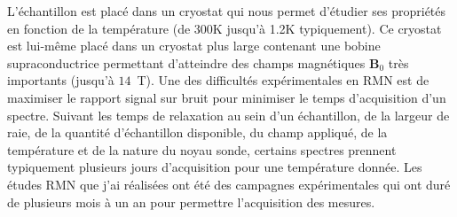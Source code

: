 L'échantillon est placé dans un cryostat qui nous permet d'étudier ses propriétés en fonction de la température (de 300K jusqu'à 1.2K typiquement). Ce cryostat est lui-même placé dans un cryostat plus large contenant une bobine supraconductrice permettant d'atteindre des champs magnétiques $\mathbf{B}_0$ très importants (jusqu'à $14$~T).
Une des difficultés expérimentales en RMN est de maximiser le rapport signal sur bruit pour minimiser le temps d'acquisition d'un spectre. Suivant les temps de relaxation au sein d'un échantillon, de la largeur de raie, de la quantité d'échantillon disponible, du champ appliqué, de la température et de la nature du noyau sonde, certains spectres prennent typiquement plusieurs jours d'acquisition pour une température donnée. Les études RMN que j'ai réalisées ont été des campagnes expérimentales qui ont duré de plusieurs mois à un an pour permettre l'acquisition des mesures.
